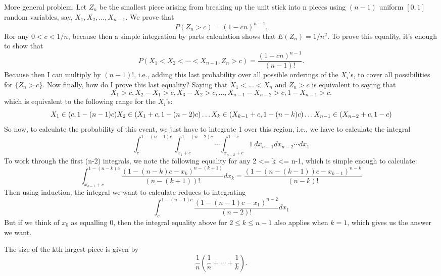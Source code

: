 More general problem.
Let $Z_n$ be the smallest piece arising from breaking up the unit stick into n pieces using $(n-1)$ uniform 
$[0,1]$ random variables, say, $X_1,X_2,...,X_{n-1}$. We prove that
$$
  P(Z_n > c) = (1-cn)^{n-1}.
$$
Ror any $0 < c < 1/n$, because then a simple integration by parts calculation shows that $E(Z_n) = 1/n^2$.
To prove this equality, it's enough to show that
$$
  P(X_1 < X_2 < \cdots < X_{n-1}, Z_n > c) = {\frac{(1-cn)^{n-1}}{(n-1)!}}.
$$
Because then I can multiply by $(n-1)!$, i.e., adding this last probability over all possible orderings of the 
$X_i$'s, to cover all possibilities for $\{Z_n > c\}$. Now finally, how do I prove this last equality?
Saying that $X_1 < ... < X_n$ and $Z_n > c$ is equivalent to saying that
$$
  X_1 > c, X_2 - X_1 > c, X_3 - X_2 > c, \ldots, X_{n-1} - X_{n-2} > c, 1 - X_{n-1} > c.
$$
which is equivalent to the following range for the $X_i$'s:
$$
  X_1 \in (c, 1-(n-1)c) \\
  X_2 \in (X_1 + c, 1-(n-2)c) \\
  \ldots \\
  X_k \in (X_{k-1} + c, 1-(n-k)c) \\
  \ldots \\
  X_{n-1} \in (X_{n-2} + c, 1 -c)
$$
So now, to calculate the probability of this event, we just have to integrate 1 over this region, 
i.e., we have to calculate the integral
$$
  \int_c^{1-(n-1)c} \int_{x_1 + c}^{1-(n-2)c} \cdots \int_{x_{n-2} + c}^{1-c} 1\ dx_{n-1} dx_{n-2} \cdots dx_1
$$
To work through the first (n-2) integrals, we note the following equality for any 2 <= k <= n-1, which is simple enough to calculate:
$$
  \int_{x_{k-1} + c}^{1-(n-k)c} \frac{(1-(n-k)c-x_k)^{n-(k+1)}}{(n-(k+1))!} dx_k = \frac{(1-(n-(k-1))c - x_{k-1})^{n-k}}{(n-k)!}
$$
Then using induction, the integral we want to calculate reduces to integrating
$$
  \int_c^{1-(n-1)c} \frac{(1-(n-1)c - x_1)^{n-2}}{(n-2)!} dx_1
$$
But if we think of $x_0$ as equalling $0$, then the integral equality above for $2 \le k \le n-1$ also applies when $k=1$, 
which gives us the answer we want.

The size of the kth largest piece is given by
$$
  \frac{1}{n}\left(\frac{1}{n} + \cdots + \frac{1}{k}\right).
$$ %


